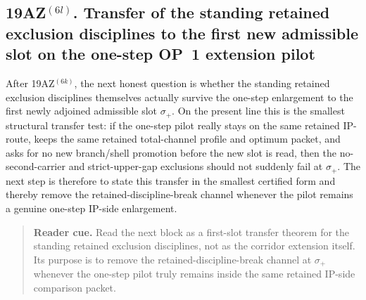 \subsection*{19AZ$^{(6l)}$. Transfer of the standing retained exclusion disciplines to the first new admissible slot on the one-step OP~1 extension pilot}
\label{sec:transfer-standing-retained-exclusion-disciplines-first-new-slot-one-step-op1-pilot}
After 19AZ$^{(6k)}$, the next honest question is whether the standing retained exclusion disciplines themselves actually survive the one-step enlargement to the first newly adjoined admissible slot $\sigma_{+}$. On the present line this is the smallest structural transfer test: if the one-step pilot really stays on the same retained IP-route, keeps the same retained total-channel profile and optimum packet, and asks for no new branch/shell promotion before the new slot is read, then the no-second-carrier and strict-upper-gap exclusions should not suddenly fail at $\sigma_{+}$. The next step is therefore to state this transfer in the smallest certified form and thereby remove the retained-discipline-break channel whenever the pilot remains a genuine one-step IP-side enlargement.

\begin{quote}\small
\noindent\textbf{Reader cue.} Read the next block as a first-slot transfer theorem for the standing retained exclusion disciplines, not as the corridor extension itself. Its purpose is to remove the retained-discipline-break channel at $\sigma_{+}$ whenever the one-step pilot truly remains inside the same retained IP-side comparison packet.
\end{quote}

